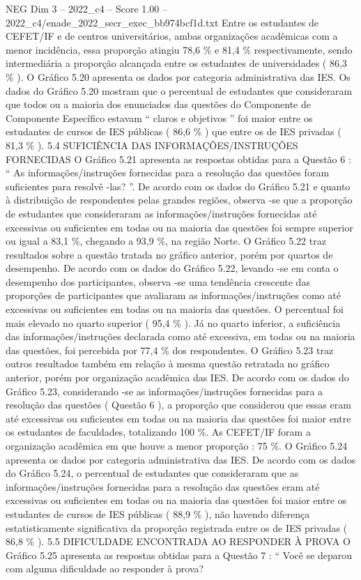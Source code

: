 \begin{textsample}{NEG Dim 3 – 2022\_c4 – Score 1.00 – 2022\_c4/enade\_2022\_secr\_exec\_bb974bcf1d.txt}
Entre os estudantes de CEFET/IF e de centros universitários, ambas organizações acadêmicas com a menor incidência, essa proporção atingiu 78,6 \% e 81,4 \% respectivamente, sendo intermediária a proporção alcançada entre os estudantes de universidades ( 86,3 \% ).
O Gráfico 5.20 apresenta os dados por categoria administrativa das IES.
Os dados do Gráfico 5.20 mostram que o percentual de estudantes que consideraram que todos ou a maioria dos enunciados das questões do Componente de Componente Específico estavam “ claros e objetivos ” foi maior entre os estudantes de cursos de IES públicas ( 86,6 \% ) que entre os de IES privadas ( 81,3 \% ). 5.4 SUFICIÊNCIA DAS INFORMAÇÕES/INSTRUÇÕES FORNECIDAS O Gráfico 5.21 apresenta as respostas obtidas para a Questão 6 : “ As informações/instruções fornecidas para a resolução das questões foram suficientes para resolvê -las? ”.
De acordo com os dados do Gráfico 5.21 e quanto à distribuição de respondentes pelas grandes regiões, observa -se que a proporção de estudantes que consideraram as informações/instruções fornecidas até excessivas ou suficientes em todas ou na maioria das questões foi sempre superior ou igual a 83,1 \%, chegando a 93,9 \%, na região Norte.
O Gráfico 5.22 traz resultados sobre a questão tratada no gráfico anterior, porém por quartos de desempenho.
De acordo com os dados do Gráfico 5.22, levando -se em conta o desempenho dos participantes, observa -se uma tendência crescente das proporções de participantes que avaliaram as informações/instruções como até excessivas ou suficientes em todas ou na maioria das questões.
O percentual foi mais elevado no quarto superior ( 95,4 \% ).
Já no quarto inferior, a suficiência das informações/instruções declarada como até excessiva, em todas ou na maioria das questões, foi percebida por 77,4 \% dos respondentes.
O Gráfico 5.23 traz outros resultados também em relação à mesma questão retratada no gráfico anterior, porém por organização acadêmica das IES.
De acordo com os dados do Gráfico 5.23, considerando -se as informações/instruções fornecidas para a resolução das questões ( Questão 6 ), a proporção que considerou que essas eram até excessivas ou suficientes em todas ou na maioria das questões foi maior entre os estudantes de faculdades, totalizando 100 \%.
As CEFET/IF foram a organização acadêmica em que houve a menor proporção : 75 \%.
O Gráfico 5.24 apresenta os dados por categoria administrativa das IES.
De acordo com os dados do Gráfico 5.24, o percentual de estudantes que consideraram que as informações/instruções fornecidas para a resolução das questões eram até excessivas ou suficientes em todas ou na maioria das questões foi maior entre os estudantes de cursos de IES públicas ( 88,9 \% ), não havendo diferença estatisticamente significativa da proporção registrada entre os de IES privadas ( 86,8 \% ). 5.5 DIFICULDADE ENCONTRADA AO RESPONDER À PROVA O Gráfico 5.25 apresenta as respostas obtidas para a Questão 7 : “ Você se deparou com alguma dificuldade ao responder à prova?

\end{textsample}
